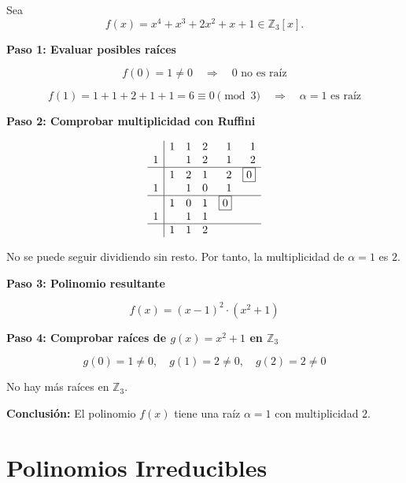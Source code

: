 \documentclass[a4paper,12pt]{article}
\begin{document}
\begin{ejemplo}[title=Raíces y multiplicidades en $\mathbb{Z}_3$]
Sea
\[
f(x) = x^4 + x^3 + 2x^2 + x + 1 \in \mathbb{Z}_3[x].
\]

\textbf{Paso 1: Evaluar posibles raíces}

\[
f(0) = 1 \neq 0 \quad\Rightarrow\quad 0 \text{ no es raíz}
\]

\[
f(1) = 1+1+2+1+1 = 6 \equiv 0 \pmod{3} \quad\Rightarrow\quad \alpha=1 \text{ es raíz}
\]

\textbf{Paso 2: Comprobar multiplicidad con Ruffini}

\[
\begin{array}{r|rrrrr}
  & 1 & 1 & 2 & 1 & 1 \\
1 &   & 1 & 2 & 1 & 2 \\
\hline
  & 1 & 2 & 1 & 2 & \boxed{0} \\
1 &   & 1 & 0 & 1 \\
\hline
  & 1 & 0 & 1  & \boxed{0} \\
1 &   & 1 & 1 \\
\hline
  & 1 & 1 & 2
\end{array}
\]

No se puede seguir dividiendo sin resto. Por tanto, la multiplicidad de \(\alpha=1\) es \(\boxed{2}\).

\textbf{Paso 3: Polinomio resultante}

\[
f(x) = (x-1)^{\boxed{2}} \cdot (x^2 + 1)
\]

\textbf{Paso 4: Comprobar raíces de \(g(x) = x^2+1\) en $\mathbb{Z}_3$}

\[
g(0) = 1 \neq 0, \quad g(1) = 2 \neq 0, \quad g(2) = 2 \neq 0
\]

No hay más raíces en \(\mathbb{Z}_3\).

\textbf{Conclusión:}  
El polinomio \(f(x)\) tiene una raíz \(\alpha = 1\) con multiplicidad \(2\).
\end{ejemplo}

\section{Polinomios Irreducibles}
\end{document}
